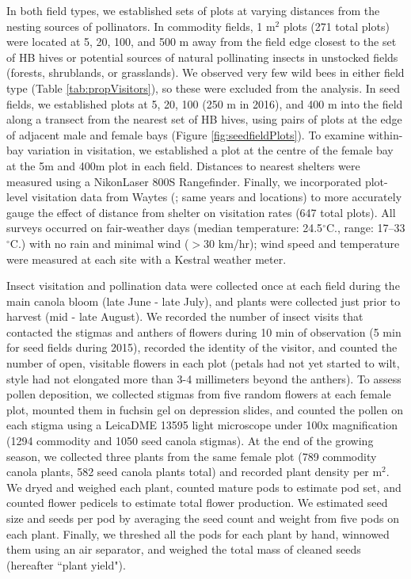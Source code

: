 \documentclass[12pt]{article} %
\begin{document}
In both field types, we established sets of plots at varying distances from the nesting sources of pollinators. 
In commodity fields, 1 m$^2$ plots (271 total plots) were located at 5, 20, 100, and 500 m away from the field edge closest to the set of HB hives or potential sources of natural pollinating insects in unstocked fields (forests, shrublands, or grasslands). 
We observed very few wild bees in either field type (Table \ref{tab:propVisitors}), so these were excluded from the analysis.
In seed fields, we established plots at 5, 20, 100 (250 m in 2016), and 400 m into the field along a transect from the nearest set of HB hives, using pairs of plots at the edge of adjacent male and female bays (Figure \ref{fig:seedfieldPlots}).
To examine within-bay variation in visitation, we established a plot at the centre of the female bay at the 5m and 400m plot in each field. 
Distances to nearest shelters were measured using a Nikon\texttrademark Laser 800S Rangefinder.
Finally, we incorporated plot-level visitation data from Waytes (\citeyear{waytes2022}; same years and locations) to more accurately gauge the effect of distance from shelter on visitation rates (647 total plots).
All surveys occurred on fair-weather days (median temperature: 24.5$^\circ$C., range: 17--33$^\circ$C.) with no rain and minimal wind ($>$30 km/hr); wind speed and temperature were measured at each site with a Kestral weather meter.

Insect visitation and pollination data were collected once at each field during the main canola bloom (late June - late July), and plants were collected just prior to harvest (mid - late August).
We recorded the number of insect visits that contacted the stigmas and anthers of flowers during 10 min of observation (5 min for seed fields during 2015), recorded the identity of the visitor, and counted the number of open, visitable flowers in each plot (petals had not yet started to wilt, style had not elongated more than 3-4 millimeters beyond the anthers).
To assess pollen deposition, we collected stigmas from five random flowers at each female plot, mounted them in fuchsin gel \citep{beattie1971} on depression slides, and counted the pollen on each stigma using a Leica\texttrademark DME 13595 light microscope under 100x magnification (1294 commodity and 1050 seed canola stigmas).
At the end of the growing season, we collected three plants from the same female plot (789 commodity canola plants, 582 seed canola plants total) and recorded plant density per m$^2$.
We dryed and weighed each plant, counted mature pods to estimate pod set, and counted flower pedicels to estimate total flower production. %
We estimated seed size and seeds per pod by averaging the seed count and weight from five pods on each plant.
Finally, we threshed all the pods for each plant by hand, winnowed them using an air separator, and weighed the total mass of cleaned seeds (hereafter ``plant yield"). %
\end{document}
